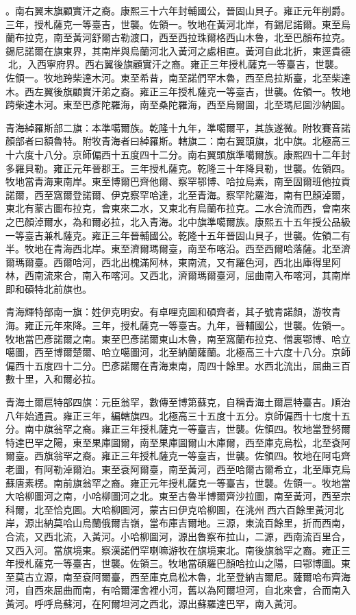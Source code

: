 \begin{pinyinscope}
。南右翼末旗顧實汗之裔。康熙三十六年封輔國公，晉固山貝子。雍正元年削爵。三年，授札薩克一等臺吉，世襲。佐領一。牧地在黃河北岸，有錫尼諾爾。東至烏蘭布拉克，南至黃河舒爾古勒渡口，西至西拉珠爾格西山木魯，北至巴顏布拉克。錫尼諾爾在旗東界，其南岸與烏蘭河北入黃河之處相直。黃河自此北折，東逕貴德北，入西寧府界。西右翼後旗顧實汗之裔。雍正三年授札薩克一等臺吉，世襲。佐領一。牧地跨柴達木河。東至希昔，南至諾們罕木魯，西至烏拉斯臺，北至柴達木。西左翼後旗顧實汗弟之裔。雍正三年授札薩克一等臺吉，世襲。佐領一。牧地跨柴達木河。東至巴彥陀羅海，南至桑陀羅海，西至烏爾圖，北至瑪尼圖沙納圖。

青海綽羅斯部二旗：本準噶爾族。乾隆十九年，準噶爾平，其族遂微。附牧賽音諾顏部者曰額魯特。附牧青海者曰綽羅斯。轄旗二：南右翼頭旗，北中旗。北極高三十六度十八分。京師偏西十五度四十二分。南右翼頭旗準噶爾族。康熙四十二年封多羅貝勒。雍正元年晉郡王。三年授札薩克。乾隆三十年降貝勒，世襲。佐領四。牧地當青海東南岸。東至博爾巴齊他爾、察罕鄂博、哈拉烏素，南至固爾班他拉貢諾爾，西至窩爾登諾爾、伊克察罕哈達，北至青海。察罕陀羅海，南有巴顏淖爾，東北有蒙古圖布拉克，會東來二水，又東北有烏蘭布拉克。二水合流而西，會南來之巴顏淖爾水，為和爾必拉，北入青海。北中旗準噶爾族。康熙五十五年授公品級一等臺吉兼札薩克。雍正三年晉輔國公。乾隆十五年晉固山貝子，世襲。佐領二有半。牧地在青海西北岸。東至濟爾瑪爾臺，南至布喀沿。西至西爾哈落薩。北至濟爾瑪爾臺。西爾哈河，西北出槐滿阿林，東南流，又有羅色河，西北出庫得里阿林，西南流來合，南入布喀河。又西北，濟爾瑪爾臺河，屈曲南入布喀河，其南岸即和碩特北前旗也。

青海輝特部南一旗：姓伊克明安。有卓哩克圖和碩齊者，其子號青諾顏，游牧青海。雍正元年來降。三年，授札薩克一等臺吉。九年，晉輔國公，世襲。佐領一。牧地當巴彥諾爾之南。東至巴彥諾爾東山木魯，南至窩蘭布拉克、僧裏鄂博、哈立噶圖，西至博爾楚爾、哈立噶圖河，北至納蘭薩蘭。北極高三十六度十八分。京師偏西十五度四十二分。巴彥諾爾在青海東南，周四十餘里。水西北流出，屈曲三百數十里，入和爾必拉。

青海土爾扈特部四旗：元臣翁罕，數傳至博第蘇克，自稱青海土爾扈特臺吉。順治八年始通貢。雍正三年，編轄旗四。北極高三十五度十五分。京師偏西十七度十五分。南中旗翁罕之裔。雍正三年授札薩克一等臺吉，世襲。佐領四。牧地當登努爾特達巴罕之陽，東至果庫圖爾，南至果庫圖爾山木庫爾，西至庫克烏松，北至袞阿爾臺。西旗翁罕之裔。雍正三年授札薩克一等臺吉，世襲。佐領四。牧地在阿屯齊老圖，有阿勒淖爾泊。東至袞阿爾臺，南至黃河，西至哈爾古爾希立，北至庫克烏蘇唐素楞。南前旗翁罕之裔。雍正元年授札薩克一等臺吉，世襲。佐領一。牧地當大哈柳圖河之南，小哈柳圖河之北。東至古魯半博爾齊沙拉圖，南至黃河，西至宗科爾，北至恰克圖。大哈柳圖河，蒙古曰伊克哈柳圖，在洮州西六百餘里黃河北岸，源出納莫哈山烏蘭俄爾吉嶺，當布庫吉爾地。三源，東流百餘里，折而西南，合流，又西北流，入黃河。小哈柳圖河，源出魯察布拉山，二源，西南流百里合，又西入河。當旗境東。察漢諾們罕喇嘛游牧在旗境東北。南後旗翁罕之裔。雍正三年授札薩克一等臺吉，世襲。佐領三。牧地當碩羅巴顏哈拉山之陽，曰鄂博圖。東至莫古立源，南至袞阿爾臺，西至庫克烏松木魯，北至登納吉爾尼。薩爾哈布齊海河，自西來屈曲而南，有哈爾渾舍裡小河，舊以為阿爾坦河，自北來會，合而南入黃河。呼呼烏蘇河，在阿爾坦河之西北，源出蘇羅達巴罕，南入黃河。


\end{pinyinscope}
